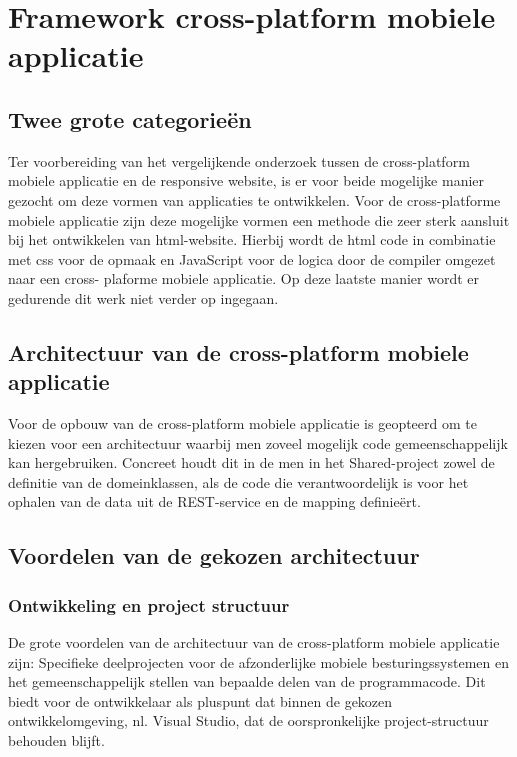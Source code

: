 \chapter{Framework cross-platform mobiele applicatie}
\label{ch:frameworkcrossplatformapp}
\section{Twee grote categorieën}
Ter voorbereiding van het vergelijkende onderzoek tussen de cross-platform mobiele applicatie en de
responsive website, is er voor beide mogelijke manier gezocht om deze vormen van applicaties te ontwikkelen. Voor de cross-platforme
mobiele applicatie zijn deze mogelijke vormen een methode die zeer sterk aansluit bij het ontwikkelen van html-website.
Hierbij wordt de html code in combinatie met css voor de opmaak en JavaScript voor de logica door de compiler omgezet naar een cross-
plaforme mobiele applicatie. Op deze laatste manier wordt er gedurende dit werk niet verder op ingegaan.

\label{sec:architectuurvandecrossplatformemobieleapplicatie}
\section{Architectuur van de cross-platform mobiele applicatie}
Voor de opbouw van de cross-platform mobiele applicatie is geopteerd om te kiezen voor een architectuur waarbij men zoveel mogelijk
code gemeenschappelijk kan hergebruiken. Concreet houdt dit in de men in het Shared-project zowel de definitie van de domeinklassen,
als de code die verantwoordelijk is voor het ophalen van de data uit de REST-service en de mapping definieërt.

\label{sec:voordelenvandegekozenapparchitectuur}
\section{Voordelen van de gekozen architectuur}
\subsection{Ontwikkeling en project structuur}
De grote voordelen van de architectuur van de cross-platform mobiele applicatie zijn: Specifieke deelprojecten voor de afzonderlijke
mobiele besturingssystemen en het gemeenschappelijk stellen van bepaalde delen van de programmacode. Dit biedt voor de ontwikkelaar
als pluspunt dat binnen de gekozen ontwikkelomgeving, nl. Visual Studio, dat de oorspronkelijke project-structuur behouden blijft.

